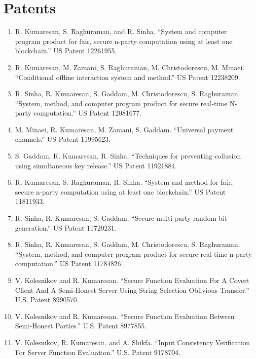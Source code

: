 \documentclass[11pt]{article}
\begin{document}
\section{Patents}
\begin{enumerate}[leftmargin=*, itemsep=1pt]
    \item R. Kumaresan, S. Raghuraman, and R. Sinha. ``System and computer program product for fair, secure n-party computation using at least one blockchain.'' US Patent 12261955.
    
    \item R. Kumaresan, M. Zamani, S. Raghuraman, M. Christodorescu, M. Minaei. ``Conditional offline interaction system and method.'' US Patent 12238209.
    
    \item R. Sinha, R. Kumaresan, S. Gaddam, M. Christodorescu, S. Raghuraman. ``System, method, and computer program product for secure real-time N-party computation.'' US Patent 12081677.
    
    \item M. Minaei, R. Kumaresan, M. Zamani, S. Gaddam. ``Universal payment channels.'' US Patent 11995623.
    
    \item S. Gaddam, R. Kumaresan, R. Sinha. ``Techniques for preventing collusion using simultaneous key release.'' US Patent 11921884.
    
    \item R. Kumaresan, S. Raghuraman, R. Sinha. ``System and method for fair, secure n-party computation using at least one blockchain.'' US Patent 11811933.
    
    \item R. Sinha, R. Kumaresan, S. Gaddam. ``Secure multi-party random bit generation.'' US Patent 11729231.
    
    \item R. Sinha, R. Kumaresan, S. Gaddam, M. Christodorescu, S. Raghuraman. ``System, method, and computer program product for secure real-time n-party computation.'' US Patent 11784826.
    
    \item V. Kolesnikov and R. Kumaresan. ``Secure Function Evaluation For A Covert Client And A Semi-Honest Server Using String Selection Oblivious Transfer.'' U.S. Patent 8990570.
    
    \item V. Kolesnikov and R. Kumaresan. ``Secure Function Evaluation Between Semi-Honest Parties.'' U.S. Patent 8977855.
    
    \item V. Kolesnikov, R. Kumaresan, and A. Shikfa. ``Input Consistency Verification For Server Function Evaluation.'' U.S. Patent 9178704.
\end{enumerate}
\end{document}
